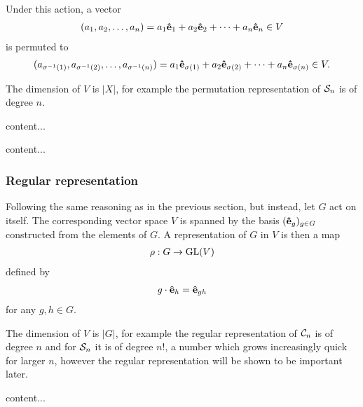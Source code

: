 	Under this action, a vector
	\begin{align*}
		(a_1, a_2, \dots, a_n) = a_1 \mathbf{\hat{e}}_1 + a_2 \mathbf{\hat{e}}_2 + \dots + a_n \mathbf{\hat{e}}_n \in V
	\end{align*}
	is permuted to 
	\begin{align*}
		(a_{\sigma^{-1}(1)}, a_{\sigma^{-1}(2)}, \dots, a_{\sigma^{-1}(n)}) = a_1 \mathbf{\hat{e}}_{\sigma(1)} + a_2 \mathbf{\hat{e}}_{\sigma(2)} + \dots + a_n \mathbf{\hat{e}}_{\sigma(n)}  \in V.
	\end{align*}
	
	
	The dimension of $V$ is $|X|$, for example the permutation representation of $\mathcal{S}_n$ is of degree $n$.
	
	\begin{example}
		content...
	\end{example}
	
	\begin{example}
		content...
	\end{example}

\subsubsection{Regular representation}

	Following the same reasoning as in the previous section, but instead, let $G$ act on itself. The corresponding vector space $V$ is spanned by the basis $(\mathbf{\hat{e}}_g)_{g \in G}$ constructed from the elements of $G$. A representation of $G$ in $V$ is then a map
	\begin{align*}
		\rho: G \rightarrow \text{GL}(V)
	\end{align*}
	defined by
	\begin{align*}
		g \cdot \mathbf{\hat{e}}_h = \mathbf{\hat{e}}_{gh}
	\end{align*}
	for any $g,h \in G$.
	
	The dimension of $V$ is $|G|$, for example the regular representation of $\mathcal{C}_n$ is of degree $n$ and for $\mathcal{S}_n$ it is of degree $n!$, a number which grows increasingly quick for larger $n$, however the regular representation will be shown to be important later.
	
	\begin{example}
		content...
	\end{example}
	
